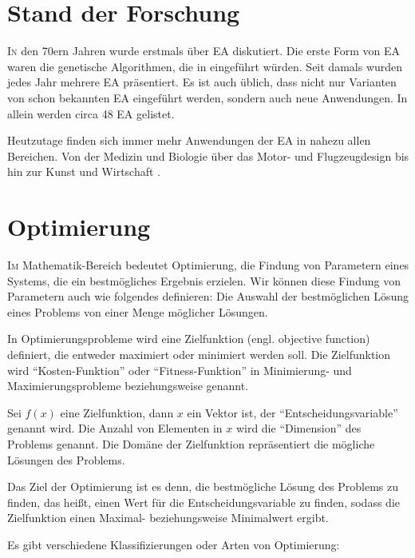 \documentclass[twoside,twocolumn]{article}
\begin{document}

\section{Stand der Forschung}
\lettrine[nindent=0em,lines=3]{I} n den 70ern Jahren wurde erstmals über EA diskutiert. Die erste Form von EA waren die genetische Algorithmen, die in \cite{holland_ga} eingeführt würden. Seit damals wurden jedes Jahr mehrere EA präsentiert. Es ist auch üblich, dass nicht nur Varianten von schon bekannten EA eingeführt werden, sondern auch neue Anwendungen. In \cite{algorithmen_list} allein werden circa 48 EA gelistet.\par
Heutzutage finden sich immer mehr Anwendungen der EA in nahezu allen Bereichen. Von der Medizin \cite{ea_und_medizin} und Biologie \cite{ea_und_biologie} über das Motor- \cite{ea_und_motoren} und Flugzeugdesign \cite{ea_und_flugzeuge_a} \cite{ea_und_flugzeuge_b} bis hin zur Kunst \cite{ea_und_kunst_a} \cite{ea_und_kunst_b} und Wirtschaft \cite{ea_und_wirtschaft}.


\section{Optimierung}
\lettrine[nindent=0em,lines=3]{I} m Mathematik-Bereich bedeutet Optimierung, die Findung von Parametern eines Systems, die ein bestmögliches Ergebnis erzielen. \cite{wiki_optimierung} Wir können diese Findung von Parametern auch wie folgendes definieren: Die Auswahl der bestmöglichen Lösung eines Problems von einer Menge möglicher Lösungen.\par
In Optimierungsprobleme wird eine Zielfunktion (engl. objective function) definiert, die entweder maximiert oder minimiert werden soll. Die Zielfunktion wird \enquote{Kosten-Funktion} oder \enquote{Fitness-Funktion} in Minimierung- und Maximierungsprobleme beziehungsweise genannt.\par
Sei $f(x)$ eine Zielfunktion, dann $x$ ein Vektor ist, der \enquote{Entscheidungsvariable} genannt wird. Die Anzahl von Elementen in $x$ wird die \enquote{Dimension} des Problems genannt.
Die Domäne der Zielfunktion repräsentiert die mögliche Lösungen des Problems. \par
Das Ziel der Optimierung ist es denn, die bestmögliche Lösung des Problems zu finden, das heißt, einen Wert für die Entscheidungsvariable zu finden, sodass die Zielfunktion einen Maximal- beziehungsweise Minimalwert ergibt.\par
Es gibt verschiedene Klassifizierungen oder Arten von Optimierung:
\end{document}
